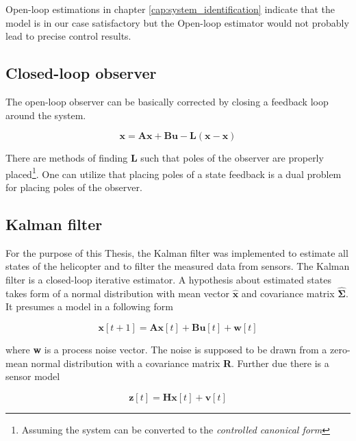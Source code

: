 Open-loop estimations in chapter \ref{cap:system_identification} indicate that the model is in our case satisfactory but the Open-loop estimator would not probably lead to precise control results.

\subsection{Closed-loop observer}

The open-loop observer can be basically corrected by closing a feedback loop around the system.

\begin{equation}
\textbf{\^x} = \textbf{A}\textbf{\^x} + \textbf{B}\textbf{u} - \textbf{L}\left(\textbf{x} - \textbf{\^x}\right)
\end{equation}

There are methods of finding $\textbf{L}$ such that poles of the observer are properly placed\footnote{Assuming the system can be converted to the \textit{controlled canonical form}}. One can utilize that placing poles of a state feedback is a dual problem for placing poles of the observer.

\subsection{Kalman filter}

For the purpose of this Thesis, the Kalman filter was implemented to estimate all states of the helicopter and to filter the measured data from sensors. The Kalman filter is a closed-loop iterative estimator. A hypothesis about estimated states takes form of a normal distribution with mean vector $\hat{\textbf{x}}$ and covariance matrix $\hat{\boldsymbol{\Sigma}}$. It presumes a model in a following form

\begin{equation}
\textbf{x}[t+1] = \textbf{A}\textbf{x}[t] + \textbf{B}\textbf{u}[t] + \textbf{w}[t]
\end{equation}

where \textbf{w} is a process noise vector. The noise is supposed to be drawn from a zero-mean normal distribution with a covariance matrix \textbf{R}. Further due there is a sensor model

\begin{equation}
\textbf{z}[t] = \textbf{H}\textbf{x}[t] + \textbf{v}[t]
\end{equation}

